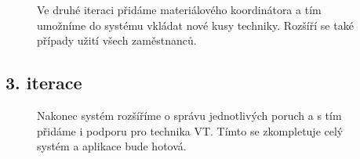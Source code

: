 \documentclass[a4paper,11pt]{article}
\begin{document}
    \begin{figure}[ht]
	\begin{center}
	\end{center}
	\caption{Ve druhé iteraci přidáme materiálového koordinátora a tím umožníme do systému vkládat nové kusy techniky. Rozšíří se také případy užití všech zaměstnanců.}
	\label{pic3} 
    \end{figure}

    \newpage
    \subsection*{3. iterace}

    \begin{figure}[ht]
	\begin{center}
	\end{center}
	\caption{Nakonec systém rozšíříme o správu jednotlivých poruch a s tím přidáme i podporu pro technika VT. Tímto se zkompletuje celý systém a aplikace bude hotová.}
	\label{pic4} 
    \end{figure}
\end{document}

